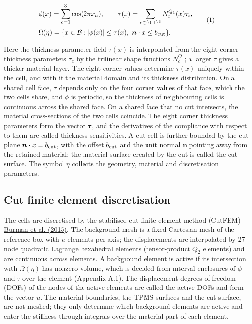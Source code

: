 \documentclass[preprint,12pt,authoryear]{elsarticle}
\begin{document}
\[
\begin{aligned}
&\phi(x)=\sum_{a=1}^{3}\cos(2\pi x_a),\qquad
\tau(x)=\sum_{c\in\{0,1\}^{3}}N_c^{Q_1}(x)\tau_c,\\
&\Omega(\eta)=\{x\in\mathcal B:|\phi(x)|\le\tau(x),\ \boldsymbol n\cdot x\le b_{\rm cut}\}.
\end{aligned}
\tag{1}
\]

Here the thickness parameter field \(\tau(x)\) is interpolated from the eight corner thickness parameters \(\tau_c\) by the trilinear shape functions \(N_c^{Q_1}\); a larger \(\tau\) gives a thicker material layer. The eight corner values determine \(\tau(x)\) uniquely within the cell, and with it the material domain and its thickness distribution. On a shared cell face, \(\tau\) depends only on the four corner values of that face, which the two cells share, and \(\phi\) is periodic, so the thickness of neighbouring cells is continuous across the shared face. On a shared face that no cut intersects, the material cross-sections of the two cells coincide. The eight corner thickness parameters form the vector \(\boldsymbol\tau\), and the derivatives of the compliance with respect to them are called thickness sensitivities. A cut cell is further bounded by the cut plane \(\boldsymbol n\cdot x=b_{\rm cut}\), with the offset \(b_{\rm cut}\) and the unit normal \(\boldsymbol n\) pointing away from the retained material; the material surface created by the cut is called the cut surface. The symbol \(\eta\) collects the geometry, material and discretisation parameters.

\subsection{Cut finite element discretisation}

The cells are discretised by the stabilised cut finite element method (CutFEM) \href{https://doi.org/10.1002/nme.4823}{Burman et al. (2015)}. The background mesh is a fixed Cartesian mesh of the reference box with \(n\) elements per axis; the displacements are interpolated by 27-node quadratic Lagrange hexahedral elements (tensor-product \(Q_2\) elements) and are continuous across elements. A background element is active if its intersection with \(\Omega(\eta)\) has nonzero volume, which is decided from interval enclosures of \(\phi\) and \(\tau\) over the element (Appendix A.1). The displacement degrees of freedom (DOFs) of the nodes of the active elements are called the active DOFs and form the vector \(u\). The material boundaries, the TPMS surfaces and the cut surface, are not meshed; they only determine which background elements are active and enter the stiffness through integrals over the material part of each element.
\end{document}
